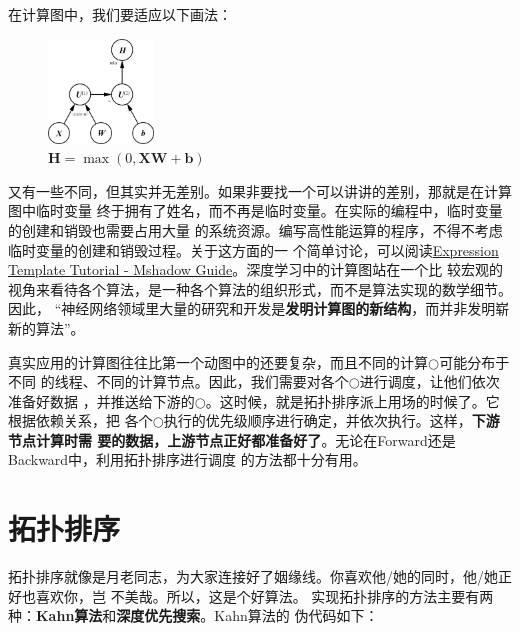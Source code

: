 \documentclass[12pt, a4paper]{article}
\begin{document}
在计算图中，我们要适应以下画法：

\begin{figure}[h!]
  \centering
  \includegraphics[width=0.25\textwidth]{assets/compute_graph.png}
  \caption{$\mathbf{H}=\max(0,\mathbf{XW}+\mathbf{b})$}
\end{figure}

又有一些不同，但其实并无差别。如果非要找一个可以讲讲的差别，那就是在计算图中临时变量
终于拥有了姓名，而不再是临时变量。在实际的编程中，临时变量的创建和销毁也需要占用大量
的系统资源。编写高性能运算的程序，不得不考虑临时变量的创建和销毁过程。关于这方面的一
个简单讨论，可以阅读\href{https://github.com/dmlc/mshadow/tree/master/guide/exp-template}
{Expression Template Tutorial - Mshadow Guide}。深度学习中的计算图站在一个比
较宏观的视角来看待各个算法，是一种各个算法的组织形式，而不是算法实现的数学细节。因此，
“神经网络领域里大量的研究和开发是\textbf{发明计算图的新结构}，而并非发明崭新的算法”。

真实应用的计算图往往比第一个动图中的还要复杂，而且不同的计算$\bigcirc$可能分布于不同
的线程、不同的计算节点。因此，我们需要对各个$\bigcirc$进行调度，让他们依次准备好数据
，并推送给下游的$\bigcirc$。这时候，就是拓扑排序派上用场的时候了。它根据依赖关系，把
各个$\bigcirc$执行的优先级顺序进行确定，并依次执行。这样，\textbf{下游节点计算时需
要的数据，上游节点正好都准备好了}。无论在Forward还是Backward中，利用拓扑排序进行调度
的方法都十分有用。

\section{拓扑排序}
拓扑排序就像是月老同志，为大家连接好了姻缘线。你喜欢他/她的同时，他/她正好也喜欢你，岂
不美哉。所以，这是个好算法。
实现拓扑排序的方法主要有两种：\textbf{Kahn算法}和\textbf{深度优先搜索}。Kahn算法的
伪代码如下：
\end{document}
